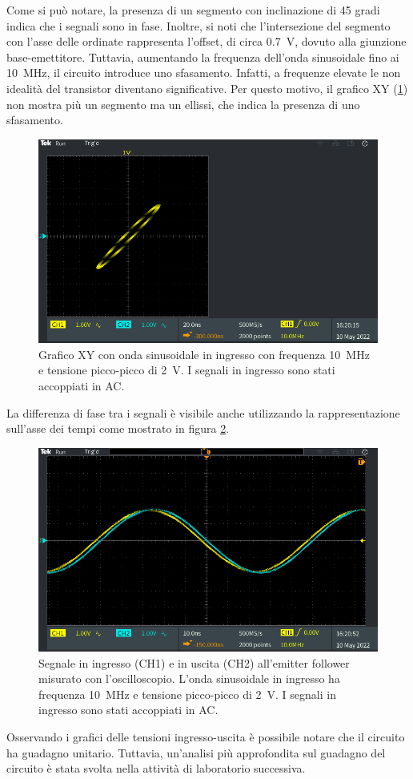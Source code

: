 \noindent
Come si può notare, la presenza di un segmento con inclinazione di 45 gradi indica che i segnali sono in fase. Inoltre, si noti che l'intersezione del segmento con l'asse delle ordinate rappresenta l'offset, di circa \SI{0.7}{\volt}, dovuto alla giunzione base-emettitore. 
Tuttavia, aumentando la frequenza dell'onda sinusoidale fino ai \SI{10}{\mega\hertz}, il circuito introduce uno sfasamento. Infatti, a frequenze elevate le non idealità del transistor diventano significative. Per questo motivo, il grafico XY (\Fig\ref{fig:emitterfollwer_XY_2}) non mostra più un segmento ma un ellissi, che indica la presenza di uno sfasamento. 
\begin{figure}[h!]
	\centering
	\includegraphics[width=0.7\linewidth]{./ImageFiles/Laboratorio 1/TEK00006}
	\caption{Grafico XY con onda sinusoidale in ingresso con frequenza \SI{10}{\mega\hertz} e tensione picco-picco di \SI{2}{\volt}. I segnali in ingresso sono stati accoppiati in AC.}
	\label{fig:emitterfollwer_XY_2}
\end{figure}
La differenza di fase tra i segnali è visibile anche utilizzando la rappresentazione sull'asse dei tempi come mostrato in figura \ref{fig:emitterfollwer_oscilloscopio_2}.
\begin{figure}[h!]
	\centering
	\includegraphics[width=0.7\linewidth]{./ImageFiles/Laboratorio 1/TEK00007}
	\caption{Segnale in ingresso (CH1) e in uscita (CH2) all'emitter follower misurato con l'oscilloscopio. L'onda sinusoidale in ingresso ha frequenza \SI{10}{\mega\hertz} e tensione picco-picco di \SI{2}{\volt}. I segnali in ingresso sono stati accoppiati in AC.}
	\label{fig:emitterfollwer_oscilloscopio_2}
\end{figure}

\noindent
Osservando i grafici delle tensioni ingresso-uscita è possibile notare che il circuito ha guadagno unitario. Tuttavia, un'analisi più approfondita sul guadagno del circuito è stata svolta nella attività di laboratorio successiva.
